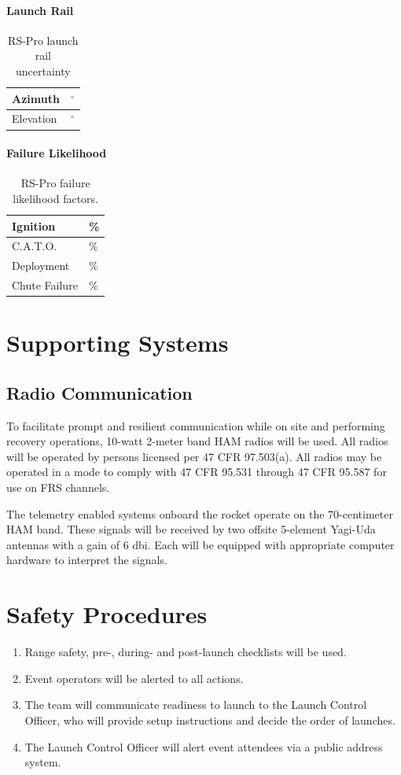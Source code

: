 \documentclass[12pt]{article}
\newcommand{\ph}{\framebox[48pt]{\rule{0pt}{12pt}}}
\begin{document}
\paragraph{Launch Rail}
\begin{table}[H]
    \centering
    \caption{RS-Pro launch rail uncertainty}
    \begin{tabular}{|l|l|}
        \hline
        Azimuth & \ph $^\circ$ \\ \hline
        Elevation & \ph $^\circ$ \\ \hline
    \end{tabular}
\end{table}
\paragraph{Failure Likelihood}
\begin{table}[H]
    \centering
    \caption{RS-Pro failure likelihood factors.}
    \begin{tabular}{|l|l|}
        \hline
        Ignition & \ph \% \\ \hline
        C.A.T.O. & \ph \% \\ \hline
        Deployment & \ph \% \\ \hline
        Chute Failure & \ph \% \\ \hline
    \end{tabular}
\end{table}
\section{Supporting Systems}
\subsection{Radio Communication}
To facilitate prompt and resilient communication while on site and performing recovery operations,
10-watt 2-meter band HAM radios will be used.
All radios will be operated by persons licensed per 47 CFR 97.503(a).
All radios may be operated in a mode to comply with 47 CFR 95.531 through 47 CFR 95.587 for use on FRS channels.

The telemetry enabled systems onboard the rocket operate on the 70-centimeter HAM band.
These signals will be received by two offsite 5-element Yagi-Uda antennas with a gain of 6 dbi.
Each will be equipped with appropriate computer hardware to interpret the signals.
\section{Safety Procedures}
\begin{enumerate}[label=(\alph*)]
    \item Range safety, pre-, during- and post-launch checklists will be used.
    \item Event operators will be alerted to all actions.
    \item The team will communicate readiness to launch to the Launch Control Officer,
    who will provide setup instructions and decide the order of launches.
    \item The Launch Control Officer will alert event attendees via a public address system.
\end{enumerate}
\end{document}
